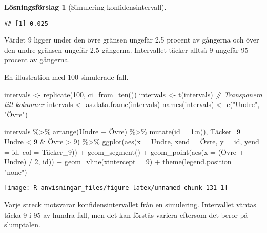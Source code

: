 \documentclass[
]{book}
\newenvironment{Shaded}{\begin{snugshade}}{\end{snugshade}}
\newcommand{\AttributeTok}[1]{\textcolor[rgb]{0.77,0.63,0.00}{#1}}
\newcommand{\CommentTok}[1]{\textcolor[rgb]{0.56,0.35,0.01}{\textit{#1}}}
\newcommand{\DecValTok}[1]{\textcolor[rgb]{0.00,0.00,0.81}{#1}}
\newcommand{\FunctionTok}[1]{\textcolor[rgb]{0.00,0.00,0.00}{#1}}
\newcommand{\NormalTok}[1]{#1}
\newcommand{\OtherTok}[1]{\textcolor[rgb]{0.56,0.35,0.01}{#1}}
\newcommand{\SpecialCharTok}[1]{\textcolor[rgb]{0.00,0.00,0.00}{#1}}
\newcommand{\StringTok}[1]{\textcolor[rgb]{0.31,0.60,0.02}{#1}}
\theoremstyle{definition}
\theoremstyle{definition}
\theoremstyle{definition}
\theoremstyle{definition}
\newtheorem{hypothesis}{Lösningsförslag}[chapter]
\theoremstyle{remark}
\begin{document}
\begin{hypothesis}[Simulering konfidensintervall]
\begin{verbatim}
## [1] 0.025
\end{verbatim}

Värdet 9 ligger under den övre gränsen ungefär 2.5 procent av gångerna och över den undre gränsen ungefär 2.5 gångerna. Intervallet täcker alltså 9 ungefär 95 procent av gångerna.

En illustration med 100 simulerade fall.

\begin{Shaded}
\begin{Highlighting}[]
\NormalTok{intervals }\OtherTok{\textless{}{-}} \FunctionTok{replicate}\NormalTok{(}\DecValTok{100}\NormalTok{, }\FunctionTok{ci\_from\_ten}\NormalTok{())}
\NormalTok{intervals }\OtherTok{\textless{}{-}} \FunctionTok{t}\NormalTok{(intervals) }\CommentTok{\# Transponera till kolumner}
\NormalTok{intervals }\OtherTok{\textless{}{-}} \FunctionTok{as.data.frame}\NormalTok{(intervals)}
\FunctionTok{names}\NormalTok{(intervals) }\OtherTok{\textless{}{-}} \FunctionTok{c}\NormalTok{(}\StringTok{"Undre"}\NormalTok{, }\StringTok{"Övre"}\NormalTok{)}

\NormalTok{intervals }\SpecialCharTok{\%\textgreater{}\%} 
  \FunctionTok{arrange}\NormalTok{(Undre }\SpecialCharTok{+}\NormalTok{ Övre) }\SpecialCharTok{\%\textgreater{}\%} 
  \FunctionTok{mutate}\NormalTok{(}\AttributeTok{id =} \DecValTok{1}\SpecialCharTok{:}\FunctionTok{n}\NormalTok{(),}
\NormalTok{         Täcker}\AttributeTok{\_9 =}\NormalTok{ Undre }\SpecialCharTok{\textless{}} \DecValTok{9} \SpecialCharTok{\&}\NormalTok{ Övre }\SpecialCharTok{\textgreater{}} \DecValTok{9}\NormalTok{) }\SpecialCharTok{\%\textgreater{}\%} 
  \FunctionTok{ggplot}\NormalTok{(}\FunctionTok{aes}\NormalTok{(}\AttributeTok{x =}\NormalTok{ Undre, }\AttributeTok{xend =}\NormalTok{ Övre, }\AttributeTok{y =}\NormalTok{ id, }\AttributeTok{yend =}\NormalTok{ id, }\AttributeTok{col =}\NormalTok{ Täcker\_9)) }\SpecialCharTok{+}
  \FunctionTok{geom\_segment}\NormalTok{() }\SpecialCharTok{+}
  \FunctionTok{geom\_point}\NormalTok{(}\FunctionTok{aes}\NormalTok{(}\AttributeTok{x =}\NormalTok{ (Övre }\SpecialCharTok{+}\NormalTok{ Undre) }\SpecialCharTok{/} \DecValTok{2}\NormalTok{, id)) }\SpecialCharTok{+}
  \FunctionTok{geom\_vline}\NormalTok{(}\AttributeTok{xintercept =} \DecValTok{9}\NormalTok{) }\SpecialCharTok{+}
  \FunctionTok{theme}\NormalTok{(}\AttributeTok{legend.position =} \StringTok{"none"}\NormalTok{)}
\end{Highlighting}
\end{Shaded}

\begin{center}\texttt{[image: R-anvisningar\_files/figure-latex/unnamed-chunk-131-1]} \end{center}

Varje streck motsvarar konfidensintervallet från en simulering. Intervallet väntas täcka 9 i 95 av hundra fall, men det kan förstås variera eftersom det beror på slumptalen.
\end{hypothesis}
\end{document}
